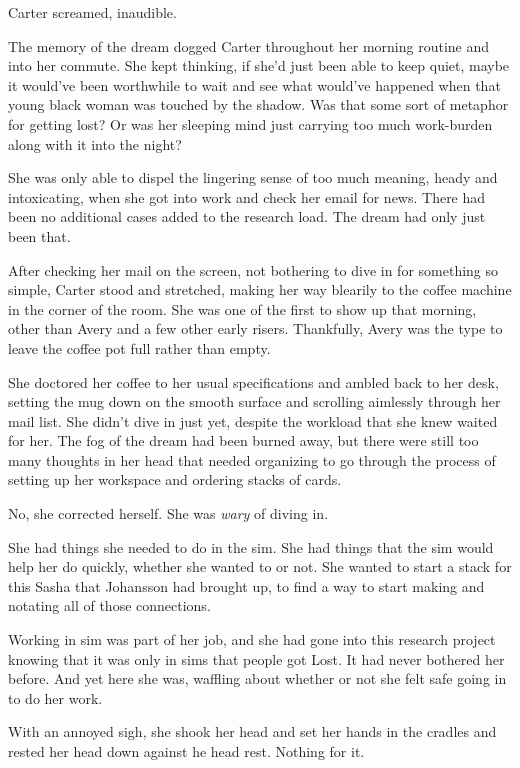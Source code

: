 Carter screamed, inaudible.

The memory of the dream dogged Carter throughout her morning routine and into her commute. She kept thinking, if she'd just been able to keep quiet, maybe it would've been worthwhile to wait and see what would've happened when that young black woman was touched by the shadow. Was that some sort of metaphor for getting lost? Or was her sleeping mind just carrying too much work-burden along with it into the night?

She was only able to dispel the lingering sense of too much meaning, heady and intoxicating, when she got into work and check her email for news. There had been no additional cases added to the research load. The dream had only just been that.

After checking her mail on the screen, not bothering to dive in for something so simple, Carter stood and stretched, making her way blearily to the coffee machine in the corner of the room. She was one of the first to show up that morning, other than Avery and a few other early risers. Thankfully, Avery was the type to leave the coffee pot full rather than empty.

She doctored her coffee to her usual specifications and ambled back to her desk, setting the mug down on the smooth surface and scrolling aimlessly through her mail list. She didn't dive in just yet, despite the workload that she knew waited for her. The fog of the dream had been burned away, but there were still too many thoughts in her head that needed organizing to go through the process of setting up her workspace and ordering stacks of cards.

No, she corrected herself. She was \emph{wary} of diving in.

She had things she needed to do in the sim. She had things that the sim would help her do quickly, whether she wanted to or not. She wanted to start a stack for this Sasha that Johansson had brought up, to find a way to start making and notating all of those connections.

Working in sim was part of her job, and she had gone into this research project knowing that it was only in sims that people got Lost. It had never bothered her before. And yet here she was, waffling about whether or not she felt safe going in to do her work.

With an annoyed sigh, she shook her head and set her hands in the cradles and rested her head down against he head rest. Nothing for it.


